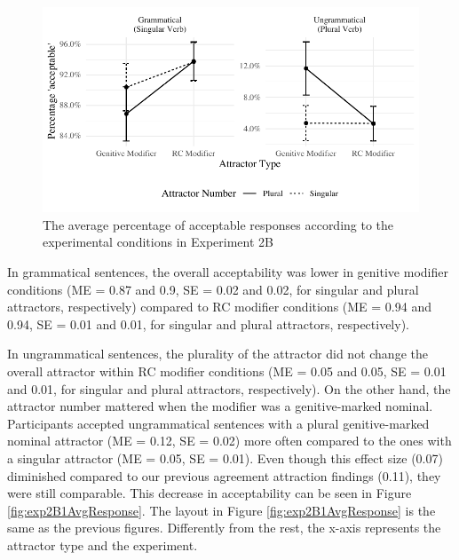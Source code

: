 \begin{knitrout}
\color{fgcolor}\begin{figure}[hbt!]

{\centering \includegraphics[width=\linewidth]{figure/exp2bAvgResponse-1} 

}

\caption[The average percentage of acceptable responses according to the experimental conditions in Experiment 2B]{The average percentage of acceptable responses according to the experimental conditions in Experiment 2B}\label{fig:exp2bAvgResponse}
\end{figure}

\end{knitrout}


In grammatical sentences, the overall acceptability was lower in genitive modifier conditions (ME = 0.87 and 0.9, SE = 0.02 and 0.02, for singular and plural attractors, respectively) compared to RC modifier conditions (ME = 0.94 and 0.94, SE = 0.01 and 0.01, for singular and plural attractors, respectively). 

In ungrammatical sentences, the plurality of the attractor did not change the overall attractor within RC modifier conditions (ME = 0.05 and 0.05, SE = 0.01 and 0.01, for singular and plural attractors, respectively). On the other hand, the attractor number mattered when the modifier was  a genitive-marked nominal. Participants accepted ungrammatical sentences with a plural genitive-marked nominal attractor (ME = 0.12, SE = 0.02) more often compared to the ones with a singular attractor (ME = 0.05, SE = 0.01). Even though this effect size (0.07) diminished compared to our previous agreement attraction findings (0.11), they were still comparable. This decrease in acceptability can be seen in Figure \ref{fig:exp2B1AvgResponse}. The layout in Figure \ref{fig:exp2B1AvgResponse} is the same as the previous figures. Differently from the rest, the x-axis represents the attractor type and the experiment.  

